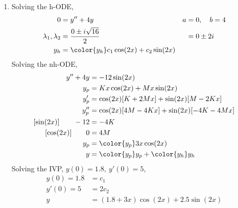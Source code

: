 \begin{enumerate}
    \item Solving the h-ODE,
          \begin{align}
              0                        & = y'' + 4y                                  &
              a                        & = 0, \quad b = 4                              \\
              \lambda_{1}, \lambda_{2} & = \frac{0 \pm i\sqrt{16}}{2}                &
                                       & = 0 \pm 2i                                    \\
              y_{h}                    & = \color{y_h} c_{1}\cos(2x) + c_{2}\sin(2x)
          \end{align}
          Solving the nh-ODE,
          \begin{align}
              y'' + 4y              & = -12\sin(2x)                               \\
              y_{p}                 & = Kx \cos(2x) + Mx \sin(2x)                 \\
              y_{p}'                & = \cos(2x)[K + 2Mx] + \sin(2x)[M - 2Kx]     \\
              y_{p}''               & = \cos(2x)[4M - 4Kx] + \sin(2x)[-4K - 4Mx]  \\
              [\sin(2x)] \qquad -12 & = -4K                                       \\
              [\cos(2x)] \qquad 0   & = 4M                                        \\
              y_{p}                 & = \color{y_p} 3x \cos(2x)                   \\
              y                     & = {\color{y_p} y_{p}} + {\color{y_h} y_{h}}
          \end{align}
          Solving the IVP, $ y(0) = 1.8,\ y'(0) = 5 $,
          \begin{align}
              y(0) = 1.8 & = c_{1}                            \\
              y'(0) = 5  & = 2c_{2}                           \\
              y          & = (1.8 + 3x)\cos(2x) + 2.5\sin(2x)
          \end{align}


\end{enumerate}
